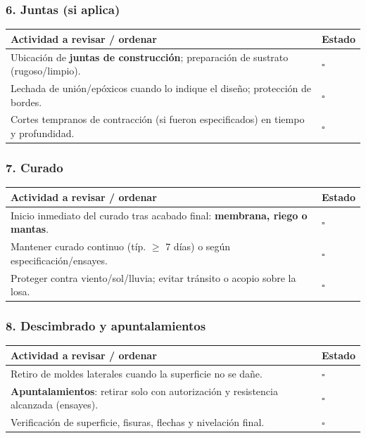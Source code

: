 \documentclass[12pt]{article}
\newcommand{\cbox}{\(\square\)} %
\begin{document}
 \subsubsection*{6. Juntas (si aplica)}
 \begin{tabularx}{\linewidth}{>{\raggedright\arraybackslash}p{0.93\linewidth} >{\centering\arraybackslash}m{0.07\linewidth}}
 	\toprule
 	\textbf{Actividad a revisar / ordenar} & \textbf{Estado}\\
 	\midrule
 	Ubicación de \textbf{juntas de construcción}; preparación de sustrato (rugoso/limpio). & \cbox \\
 	Lechada de unión/epóxicos cuando lo indique el diseño; protección de bordes. & \cbox \\
 	Cortes tempranos de contracción (si fueron especificados) en tiempo y profundidad. & \cbox \\
 	\bottomrule
 \end{tabularx}
 
 \subsubsection*{7. Curado}
 \begin{tabularx}{\linewidth}{>{\raggedright\arraybackslash}p{0.93\linewidth} >{\centering\arraybackslash}m{0.07\linewidth}}
 	\toprule
 	\textbf{Actividad a revisar / ordenar} & \textbf{Estado}\\
 	\midrule
 	Inicio inmediato del curado tras acabado final: \textbf{membrana, riego o mantas}. & \cbox \\
 	Mantener curado continuo (típ. \(\geq\) 7 días) o según especificación/ensayes. & \cbox \\
 	Proteger contra viento/sol/lluvia; evitar tránsito o acopio sobre la losa. & \cbox \\
 	\bottomrule
 \end{tabularx}
 
 \subsubsection*{8. Descimbrado y apuntalamientos}
 \begin{tabularx}{\linewidth}{>{\raggedright\arraybackslash}p{0.93\linewidth} >{\centering\arraybackslash}m{0.07\linewidth}}
 	\toprule
 	\textbf{Actividad a revisar / ordenar} & \textbf{Estado}\\
 	\midrule
 	Retiro de moldes laterales cuando la superficie no se dañe. & \cbox \\
 	\textbf{Apuntalamientos}: retirar solo con autorización y resistencia alcanzada (ensayes). & \cbox \\
 	Verificación de superficie, fisuras, flechas y nivelación final. & \cbox \\
 	\bottomrule
 \end{tabularx}
 
\end{document}
